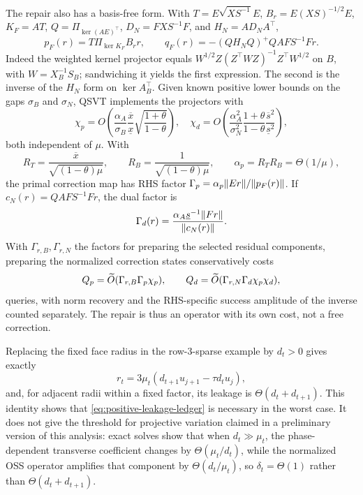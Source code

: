 The repair also has a basis-free form.  With
$T=E\sqrt{XS^{-1}}E$, $B_r=E(XS)^{-1/2}E$, $K_F=AT$, $Q=\Pi_{\ker(AE)^\top}$,
$D_N=FXS^{-1}F$, and $H_N=AD_NA^\top$,
\begin{equation}
 p_F(r)=T\Pi_{\ker K_F}B_rr,\qquad
 q_F(r)=-(QH_NQ)^+QAFS^{-1}Fr.                          \label{eq:positive-basis-free-repair}
\end{equation}
Indeed the weighted kernel projector equals
$W^{1/2}Z(Z^\top WZ)^{-1}Z^\top W^{1/2}$ on $B$, with $W=X_B^{-1}S_B$;
sandwiching it yields the first expression.  The second is the inverse of the
$H_N$ form on $\ker A_B^\top$.  Given known positive lower bounds on the gaps $\sigma_B$ and $\sigma_N$,
QSVT implements the projectors with
\begin{equation}
 \chi_p=O\!\left(\frac{\alpha_A}{\sigma_B}
 \frac{\overline x}{\underline x}\sqrt{\frac{1+\theta}{1-\theta}}\right),
 \quad
 \chi_d=O\!\left(\frac{\alpha_A^2}{\sigma_N^2}
 \frac{1+\theta}{1-\theta}\frac{\overline s^2}{\underline s^2}\right), \label{eq:positive-face-condition-ledger}
\end{equation}
both independent of $\mu$.  With
\[
 R_T=\frac{\overline x}{\sqrt{(1-\theta)\mu}},\qquad
 R_B=\frac{1}{\sqrt{(1-\theta)\mu}},\qquad
 \alpha_p=R_TR_B=\Theta(1/\mu),
\]
the primal correction map has RHS factor
$\Gamma_p=\alpha_p\lVert Er\rVert/\lVert p_F(r)\rVert$.  If
$c_N(r)=QAFS^{-1}Fr$, the dual factor is
\[
 \Gamma_d(r)=\frac{\alpha_A\underline s^{-1}\lVert Fr\rVert}
                   {\lVert c_N(r)\rVert}.
\]
With $\Gamma_{r,B},\Gamma_{r,N}$ the factors for preparing the selected
residual components, preparing the normalized correction states conservatively
costs
\begin{equation}
 Q_p=\widetilde{O}(\Gamma_{r,B}\Gamma_p\chi_p),\qquad
 Q_d=\widetilde{O}(\Gamma_{r,N}\Gamma_d\chi_p\chi_d),          \label{eq:positive-repair-query-ledger}
\end{equation}
queries, with norm recovery and the RHS-specific success amplitude of the
inverse counted separately.  The repair is thus an operator with its own cost,
not a free correction.

Replacing the fixed face radius in the row-$3$-sparse example by $d_t>0$
gives exactly
\[
 r_t=3\mu_t(d_{t+1}u_{j+1}-\tau d_tu_j),
\]
and, for adjacent radii within a fixed factor, its leakage is
$\Theta(d_t+d_{t+1})$.  This identity shows that
\eqref{eq:positive-leakage-ledger} is necessary in the worst case.  It does
not give the threshold for projective variation claimed in a preliminary
version of this analysis: exact solves show that when
$d_t\gg\mu_t$, the phase-dependent transverse coefficient changes by
$\Theta(\mu_t/d_t)$, while the normalized OSS operator amplifies that component
by $\Theta(d_t/\mu_t)$, so $\delta_t=\Theta(1)$ rather than
$\Theta(d_t+d_{t+1})$.

